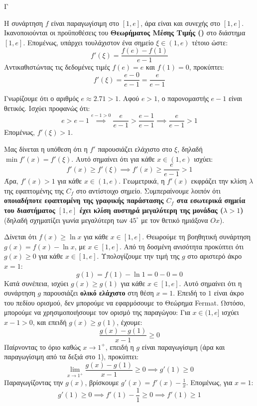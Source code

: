 \begin{thema}{Γ}
\begin{erwthma}

\item Η συνάρτηση $f$ είναι παραγωγίσιμη στο $[1, e]$, άρα είναι και συνεχής στο $[1,e]$. 
Ικανοποιούνται οι προϋποθέσεις του \textbf{Θεωρήματος Μέσης Τιμής ()} στο διάστημα $[1, e]$.
Επομένως, υπάρχει τουλάχιστον ένα σημείο $\xi \in (1, e)$ τέτοιο ώστε:
\[ f'(\xi) = \frac{f(e) - f(1)}{e - 1} \]
Αντικαθιστώντας τις δεδομένες τιμές $f(e) = e$ και $f(1) = 0$, προκύπτει:
\[ f'(\xi) = \frac{e - 0}{e - 1} = \frac{e}{e - 1} \]

\item Γνωρίζουμε ότι ο αριθμός $e \approx 2.71 > 1$. Αφού $e > 1$, ο παρονομαστής $e-1$ είναι θετικός. 
Ισχύει προφανώς ότι:
\[ e > e - 1 \overset{e-1>0}{\implies} \frac{e}{e - 1} > \frac{e - 1}{e - 1} \implies \frac{e}{e - 1} > 1 \]
Επομένως, $f'(\xi) > 1$.

Μας δίνεται η υπόθεση ότι η $f'$ παρουσιάζει ελάχιστο στο $\xi$, δηλαδή $\min f'(x) = f'(\xi)$. 
Αυτό σημαίνει ότι για κάθε $x \in (1, e)$ ισχύει:
\[ f'(x) \ge f'(\xi) \implies f'(x) \ge \frac{e}{e-1} > 1 \]
Άρα, $f'(x) > 1$ για κάθε $x \in (1, e)$. 
Γεωμετρικά, η $f'(x)$ εκφράζει την κλίση $\lambda$ της εφαπτομένης της $C_f$ στο αντίστοιχο σημείο. Συμπεραίνουμε λοιπόν ότι \textbf{οποιαδήποτε εφαπτομένη της γραφικής παράστασης $C_f$ στα εσωτερικά σημεία του διαστήματος $[1, e]$ έχει κλίση αυστηρά μεγαλύτερη της μονάδας ($\lambda > 1$)} (δηλαδή σχηματίζει γωνία μεγαλύτερη των $45^\circ$ με τον θετικό ημιάξονα $Ox$).

\item Δίνεται ότι $f(x) \geq \ln x$ για κάθε $x \in [1, e]$.
Θεωρούμε τη βοηθητική συνάρτηση $g(x) = f(x) - \ln x$, με $x \in [1, e]$. 
Από τη δοσμένη ανισότητα προκύπτει ότι $g(x) \geq 0$ για κάθε $x \in [1, e]$.
Υπολογίζουμε την τιμή της $g$ στο αριστερό άκρο $x=1$:
\[ g(1) = f(1) - \ln 1 = 0 - 0 = 0 \]
Κατά συνέπεια, ισχύει $g(x) \geq g(1)$ για κάθε $x \in [1, e]$. Αυτό σημαίνει ότι η συνάρτηση $g$ παρουσιάζει \textbf{ολικό ελάχιστο} στη θέση $x=1$.
Επειδή το $1$ είναι άκρο του πεδίου ορισμού, δεν μπορούμε να εφαρμόσουμε το Θεώρημα Fermat. Ωστόσο, μπορούμε να χρησιμοποιήσουμε τον ορισμό της παραγώγου:
Για $x \in (1, e]$ ισχύει $x - 1 > 0$, και επειδή $g(x) \ge g(1)$, έχουμε:
\[ \frac{g(x) - g(1)}{x - 1} \ge 0 \]
Παίρνοντας το όριο καθώς $x \to 1^+$, επειδή η $g$ είναι παραγωγίσιμη (άρα και παραγωγίσιμη από τα δεξιά στο 1), προκύπτει:
\[ \lim_{x \to 1^+} \frac{g(x) - g(1)}{x - 1} \ge 0 \implies g'(1) \ge 0 \]
Παραγωγίζοντας την $g(x)$, βρίσκουμε $g'(x) = f'(x) - \frac{1}{x}$. Επομένως, για $x=1$:
\[ g'(1) \ge 0 \implies f'(1) - \frac{1}{1} \ge 0 \implies f'(1) \ge 1 \]


\end{erwthma}
\end{thema}
